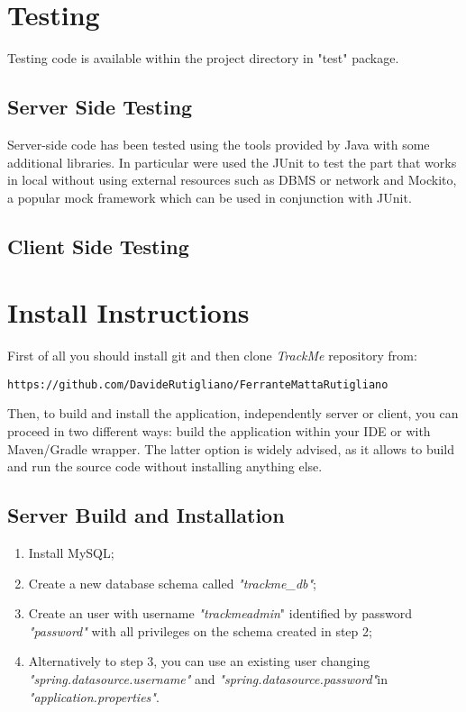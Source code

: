 \documentclass[a4paper]{article}
\begin{document}
\newpage
\section{Testing}
Testing code is available within the project directory in "test" package.

\subsection{Server Side Testing}
Server-side code has been tested using the tools provided by Java with some additional libraries. In particular were used the JUnit to test the part that works in local without using external resources such as DBMS or network and Mockito, a popular mock framework which can be used in conjunction with JUnit.

\subsection{Client Side Testing}

\newpage
\section{Install Instructions}

First of all you should install git and then clone \textit{TrackMe} repository from:
\begin{lstlisting}
https://github.com/DavideRutigliano/FerranteMattaRutigliano
\end{lstlisting}

Then, to build and install the application, independently server or client, you can proceed in two different ways: build the application within your IDE or with Maven/Gradle wrapper. The latter option is widely advised, as it allows to build and run the source code without installing anything else.

\subsection{Server Build and Installation}
\begin{enumerate}
    \item Install MySQL;
    \item Create a new database schema called \textit{"trackme\_db"};
    \item Create an user with username \textit{"trackmeadmin}" identified by password \textit{"password"} with all privileges on the schema created in step 2; \item Alternatively to step 3, you can use an existing user changing
    \newline\textit{"spring.datasource.username"} and \textit{"spring.datasource.password"}\newline in \textit{"application.properties"}. 
\end{enumerate}
\end{document}
